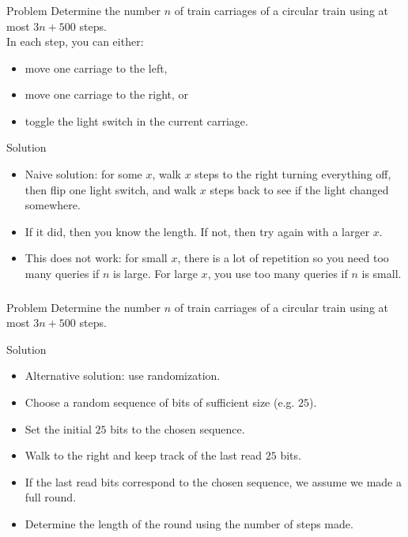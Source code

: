 \begin{frame}
    \frametitle{\problemtitle}
    \begin{block}{Problem}
        Determine the number $n$ of train carriages of a circular train using at most $3n + 500$ steps. \\
        In each step, you can either:
        \begin{itemize}
            \item move one carriage to the left,
            \item move one carriage to the right, or
            \item toggle the light switch in the current carriage.
        \end{itemize}
    \end{block}
    \pause
    \begin{block}{Solution}
        \begin{itemize}
            \item<+-> Naive solution: for some $x$, walk $x$ steps to the right
                turning everything off, then flip one light switch, and walk $x$ steps back to see if the light changed somewhere.
            \item<+-> If it did, then you know the length. If not, then try again with a larger $x$.
            \item<+-> This does not work: for small $x$, there is a lot of repetition so you need too many queries if $n$ is large. For large $x$, you use too many queries if $n$ is small.
        \end{itemize}
    \end{block}
\end{frame}

\begin{frame}
    \frametitle{\problemtitle}
    \begin{block}{Problem}
        Determine the number $n$ of train carriages of a circular train using at most $3n + 500$ steps.
    \end{block}
    \begin{block}{Solution}
        \begin{itemize}
            \item<+-> Alternative solution: use randomization.
            \item<+-> Choose a random sequence of bits of sufficient size (e.g. $25$).
            \item<+-> Set the initial $25$ bits to the chosen sequence.
            \item<+-> Walk to the right and keep track of the last read $25$ bits.
            \item<+-> If the last read bits correspond to the chosen sequence, we assume we made a full round.
            \item<+-> Determine the length of the round using the number of steps made.
        \end{itemize}
    \end{block}
\end{frame}


